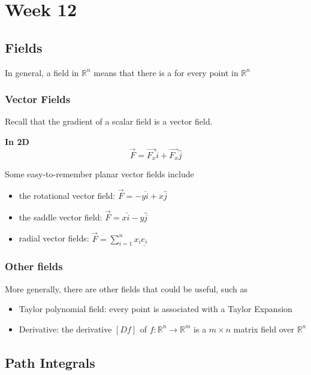 \chapter{Week 12}

\section{Fields}

In general, a  field in $ \mathbb{R}^n$ means that there is a  for every point in $ \mathbb{R}^n$

\subsection{Vector Fields}

Recall that the gradient of a scalar field is a vector field.

\textbf{In 2D}
\[
   \vec{F} = \vec{F_x} \hat{i} + \vec{F_x} \hat{j}
\]  

Some easy-to-remember planar vector fields include
\begin{itemize}
   \item the rotational vector field: $\vec{F}  = -y \hat{i} + x \hat{j}$
   \item the saddle vector field: $\vec{F}  = x \hat{i} - y \hat{j}$
   \item radial vector fields: $\vec{F}  = \sum\limits_{i=1}^{n} x_i  \underline{e_i}$
\end{itemize}

\subsection{Other fields}
More generally, there are other fields that could be useful, such as
\begin{itemize}
   \item Taylor polynomial field: every point is associated with a Taylor Expansion
   \item Derivative: the derivative $\left[ D f \right]_{} $ of $f: \mathbb{R}^n \rightarrow \mathbb{R}^m$ is a $m \times n$ matrix field over $ \mathbb{R}^n$
\end{itemize}

\section{Path Integrals}

